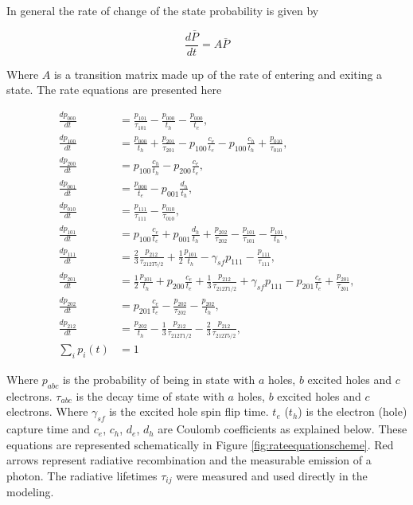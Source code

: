 \documentclass[12pt, twoside]{article}
\numberwithin{equation}{section}
\begin{document}
In general the rate of change of the state probability is given by

\begin{equation}
\frac{d \bar{P}}{dt} = A \bar{P}
\end{equation}

Where $A$ is a transition matrix made up of the rate of entering and
exiting a state. The rate equations are presented here

\begin{align}
\frac{d p_{000}}{dt}&= \frac{p_{101}}{\tau_{101}} - \frac{p_{000}}{t_h}        - \frac{p_{000}}{t_e}, \\[5pt]
\frac{d p_{100}}{dt}&= \frac{p_{000}}{t_h}       + \frac{p_{201}}{\tau_{201}} - p_{100}\frac{c_e}{t_e} - p_{100}\frac{c_h}{t_h} + \frac{p_{010}}{\tau_{010}},\\[5pt]
\frac{d p_{200}}{dt}&= p_{100}\frac{c_h}{t_h}     - p_{200}\frac{c_e}{t_e},\\[5pt]
\frac{d p_{001}}{dt}&= \frac{p_{000}}{t_e}        - p_{001}\frac{d_h}{t_h},\\[5pt]
\frac{d p_{010}}{dt}&= \frac{p_{111}}{\tau_{111}} - \frac{p_{010}}{\tau_{010}},\\[5pt]
\frac{d p_{101}}{dt}&= p_{100}\frac{c_e}{t_e}     + p_{001}\frac{d_h}{t_h}    + \frac{p_{202}}{\tau_{202}} - \frac{p_{101}}{\tau_{101}}- \frac{p_{101}}{t_h},\\[5pt]
\frac{d p_{111}}{dt}&= \frac{2}{3}\frac{p_{212}}{\tau_{212T5/2}}              + \frac{1}{2}\frac{p_{101}}{t_h} - \gamma_{sf}p_{111} - \frac{p_{111}}{\tau_{111}},\\[5pt]
\frac{d p_{201}}{dt}&= \frac{1}{2}\frac{p_{101}}{t_h} + p_{200}\frac{c_e}{t_e}+ \frac{1}{3}\frac{p_{212}}{\tau_{212T1/2}} + \gamma_{sf}p_{111} - p_{201}\frac{c_e}{t_e} + \frac{p_{201}}{\tau_{201}},\\[5pt]
\frac{d p_{202}}{dt}&= p_{201}\frac{c_e}{t_e}     - \frac{p_{202}}{\tau_{202}}- \frac{p_{202}}{t_h},\\[5pt]
\frac{d p_{212}}{dt}&= \frac{p_{202}}{t_h}        - \frac{1}{3}\frac{p_{212}}{\tau_{212T1/2}} - \frac{2}{3}\frac{p_{212}}{\tau_{212T5/2}},\\[5pt]
\sum_ip_i(t)&= 1 
\end{align}

Where $p_{abc}$ is the probability of being in state with $a$ holes, $b$
excited holes and $c$ electrons. $\tau_{abc}$ is the decay time of state
with $a$ holes, $b$ excited holes and $c$ electrons. Where $\gamma_{sf}$
is the excited hole spin flip time. $t_e$ ($t_h$) is the electron (hole)
capture time and $c_e$, $c_h$, $d_e$, $d_h$ are Coulomb coefficients as
explained below. These equations are represented schematically in Figure
\ref{fig:rateequationscheme}. Red arrows represent radiative
recombination and the measurable emission of a photon. The radiative
lifetimes $\tau_{ij}$ were measured and used directly in the modeling.
\end{document}
